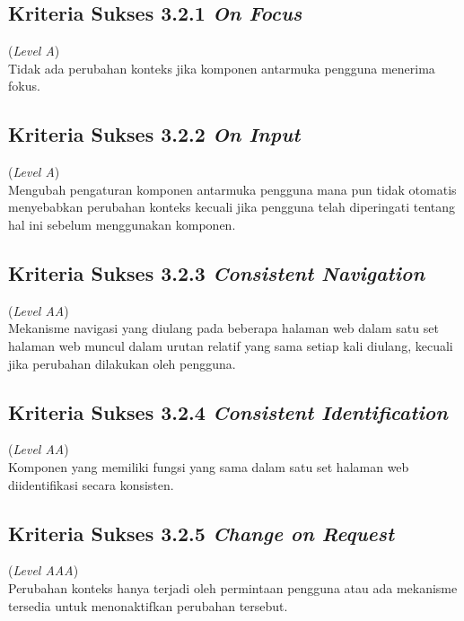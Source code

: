 \subsection{Kriteria Sukses 3.2.1 \textit{On Focus}}
\label{subsec:kriteria_3.2.1}
(\textit{Level A}) \\

Tidak ada perubahan konteks jika komponen antarmuka pengguna menerima fokus.

\subsection{Kriteria Sukses 3.2.2 \textit{On Input}}
\label{subsec:kriteria_3.2.2}
(\textit{Level A}) \\

Mengubah pengaturan komponen antarmuka pengguna mana pun tidak otomatis menyebabkan perubahan konteks kecuali jika pengguna telah diperingati tentang hal ini sebelum menggunakan komponen.

\subsection{Kriteria Sukses 3.2.3 \textit{Consistent Navigation}}
\label{subsec:kriteria_3.2.3}
(\textit{Level AA}) \\

Mekanisme navigasi yang diulang pada beberapa halaman web dalam satu set halaman web muncul dalam urutan relatif yang sama setiap kali diulang, kecuali jika perubahan dilakukan oleh pengguna.

\subsection{Kriteria Sukses 3.2.4 \textit{Consistent Identification}}
\label{subsec:kriteria_3.2.4}
(\textit{Level AA}) \\

Komponen yang memiliki fungsi yang sama dalam satu set halaman web diidentifikasi secara konsisten.

\subsection{Kriteria Sukses 3.2.5 \textit{Change on Request}}
\label{subsec:kriteria_3.2.5}
(\textit{Level AAA}) \\

Perubahan konteks hanya terjadi oleh permintaan pengguna atau ada mekanisme tersedia untuk menonaktifkan perubahan tersebut.

